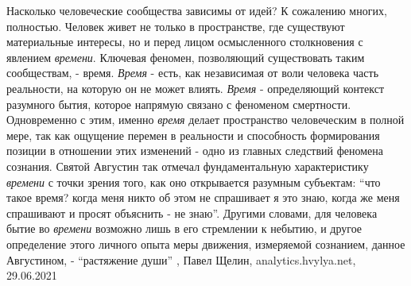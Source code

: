 Насколько человеческие сообщества зависимы от идей? К сожалению многих,
полностью. Человек живет не только в пространстве, где существуют материальные
интересы, но и перед лицом осмысленного столкновения с явлением \emph{времени}.
Ключевая феномен, позволяющий существовать таким сообществам, - время. \emph{Время} -
есть, как независимая от воли человека часть реальности, на которую он не может
влиять. \emph{Время} - определяющий контекст разумного бытия, которое напрямую связано
с феноменом смертности. Одновременно с этим, именно \emph{время} делает пространство
человеческим в полной мере, так как ощущение перемен в реальности и способность
формирования позиции в отношении этих изменений - одно из главных следствий
феномена сознания. Святой Августин так отмечал фундаментальную характеристику
\emph{времени} с точки зрения того, как оно открывается разумным субъектам: \enquote{что такое
время? когда меня никто об этом не спрашивает я это знаю, когда же меня
спрашивают и просят объяснить - не знаю}. Другими словами, для человека бытие
во \emph{времени} возможно лишь в его стремлении к небытию, и другое определение этого
личного опыта меры движения, измеряемой сознанием, данное Августином, -
\enquote{растяжение души}
, Павел Щелин, 
analytics.hvylya.net, 29.06.2021
